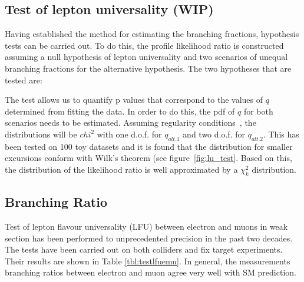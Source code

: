 \subsection{Test of lepton universality (\textbf{WIP})}

Having established the method for estimating the branching fractions,
hypothesis tests can be carried out.  To do this, the profile likelihood
ratio is constructed assuming a null hypothesis of lepton universality
and two scenarios of unequal branching fractions for the alternative
hypothesis.  The two hypotheses that are tested are:


The test allows us to quantify p values that correspond to the values of
$q$ determined from fitting the data.  In order to do this, the pdf of
$q$ for both scenarios needs to be estimated.  Assuming regularity
conditions~\cite{Wilks}, the distributions will be $chi^{2}$ with one
d.o.f. for $q_{alt. 1}$ and two d.o.f. for $q_{alt. 2}$.  This has been
tested on 100 toy datasets and it is found that the distribution for
smaller excursions conform with Wilk's theorem (see
figure~\ref{fig:lu_test}.  Based on this, the distribution of the
likelihood ratio is well approximated by a $\chi^{2}_{k}$ distribution.




\subsection{Branching Ratio}

Test of lepton flavour universality (LFU) between electron and muons in 
weak section has been performed to unprecedented precision
in the past two decades. The tests have been carried out on both
colliders and fix target experiments. Their results are shown
in Table \ref{tbl:testlfuemu}. In general, the measurements
branching ratios between electron and muon agree very well with 
SM prediction.


